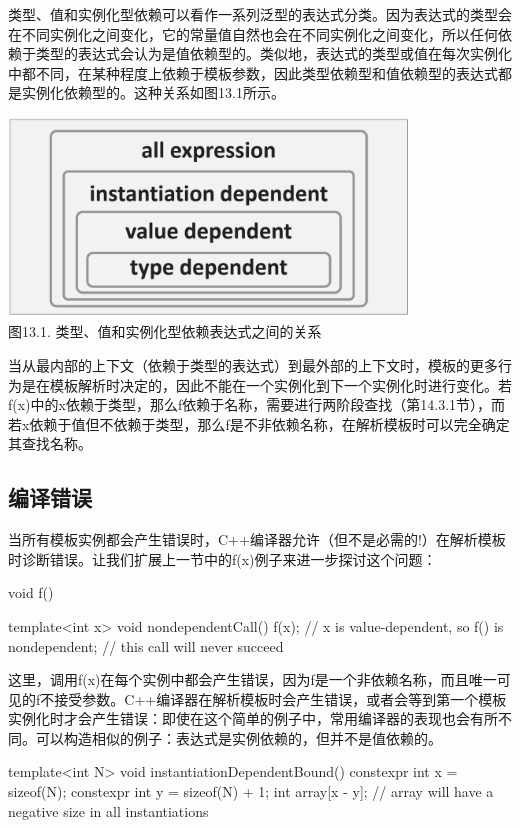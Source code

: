 类型、值和实例化型依赖可以看作一系列泛型的表达式分类。因为表达式的类型会在不同实例化之间变化，它的常量值自然也会在不同实例化之间变化，所以任何依赖于类型的表达式会认为是值依赖型的。类似地，表达式的类型或值在每次实例化中都不同，在某种程度上依赖于模板参数，因此类型依赖型和值依赖型的表达式都是实例化依赖型的。这种关系如图13.1所示。

\begin{center}
\includegraphics[width=0.8\textwidth]{part2/ch13/images/1.png} \\
图13.1. 类型、值和实例化型依赖表达式之间的关系
\end{center}

当从最内部的上下文（依赖于类型的表达式）到最外部的上下文时，模板的更多行为是在模板解析时决定的，因此不能在一个实例化到下一个实例化时进行变化。若f(x)中的x依赖于类型，那么f依赖于名称，需要进行两阶段查找（第14.3.1节），而若x依赖于值但不依赖于类型，那么f是不非依赖名称，在解析模板时可以完全确定其查找名称。

\subsection{编译错误}

当所有模板实例都会产生错误时，C++编译器允许（但不是必需的!）在解析模板时诊断错误。让我们扩展上一节中的f(x)例子来进一步探讨这个问题：

\begin{cpp}
void f() { }

template<int x> void nondependentCall()
{
	f(x); // x is value-dependent, so f() is nondependent;
	// this call will never succeed
}
\end{cpp}

这里，调用f(x)在每个实例中都会产生错误，因为f是一个非依赖名称，而且唯一可见的f不接受参数。C++编译器在解析模板时会产生错误，或者会等到第一个模板实例化时才会产生错误：即使在这个简单的例子中，常用编译器的表现也会有所不同。可以构造相似的例子：表达式是实例依赖的，但并不是值依赖的。

\begin{cpp}
template<int N> void instantiationDependentBound()
{
	constexpr int x = sizeof(N);
	constexpr int y = sizeof(N) + 1;
	int array[x - y]; // array will have a negative size in all instantiations
}
\end{cpp}












